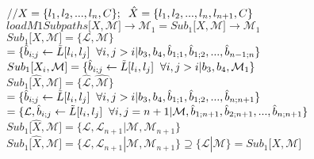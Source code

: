 \documentclass[11pt]{article}
\begin{document}
\begin{center}
$
// X = \{l_1,l_2,...,l_n,C\}; \hspace{2mm} \hat{X} = \{l_1,l_2,...,l_n,l_{n+1},C\}
$
\\ \vspace{4mm}
$
loadM1Subpaths\lbrack X, \mathcal{M}\rbrack \rightarrow \mathcal{M}_1 = Sub_1\lbrack X, \mathcal{M} \rbrack \rightarrow \mathcal{M}_1
$
\\ \vspace{8mm}
$
Sub_1 \lbrack X, \mathcal{M} \rbrack = \{ \mathcal{L},\mathcal{M}\}
$
\\ \vspace{2mm}
$
= \{ \hat{b}_{i;j} \leftarrow \tilde{L}\lbrack l_i,l_j \rbrack \hspace{2mm} \forall i,j>i | b_3,b_4,\hat{b}_{1;1},\hat{b}_{1;2},...,\hat{b}_{n-1;n}\}
$
\\ \vspace{3mm}
$
Sub_1 \lbrack X_i, \mathcal{M} \rbrack = \{ \hat{b}_{i;j} \leftarrow \tilde{L}\lbrack l_i,l_j \rbrack \hspace{2mm} \forall i,j>i | b_3,b_4,\mathcal{M}_1\}
$
\\ \vspace{8mm}
$
Sub_1 \lbrack \hat{X}, \mathcal{M} \rbrack = \{ \hat{\mathcal{L}},\hat{\mathcal{M}}\}
$
\\ \vspace{2mm}
$
= \{ \hat{b}_{i;j} \leftarrow \tilde{L}\lbrack l_i,l_j \rbrack \hspace{2mm} \forall i,j>i | b_3,b_4,\hat{b}_{1;1},\hat{b}_{1;2},...,\hat{b}_{n;n+1}\}
$
\\ \vspace{2mm}
$
= \{ \mathcal{L}, \hat{b}_{i;j} \leftarrow \tilde{L}\lbrack l_i,l_j \rbrack \hspace{2mm} \forall i,j=n+1 | \mathcal{M}, \hat{b}_{1;n+1},\hat{b}_{2;n+1},...,\hat{b}_{n;n+1}\}
$
\\ \vspace{2mm}
$
Sub_1 \lbrack \hat{X}, \mathcal{M} \rbrack = \{ \mathcal{L}, \mathcal{L}_{n+1} | \mathcal{M}, \mathcal{M}_{n+1}\}
$
\\ \vspace{3mm}
$
Sub_1 \lbrack \hat{X}, \mathcal{M} \rbrack = \{ \mathcal{L}, \mathcal{L}_{n+1} | \mathcal{M}, \mathcal{M}_{n+1}\} \supseteq \{ \mathcal{L} | \mathcal{M}\} = Sub_1 \lbrack X, \mathcal{M} \rbrack 
$
\end{center}
\end{document}

